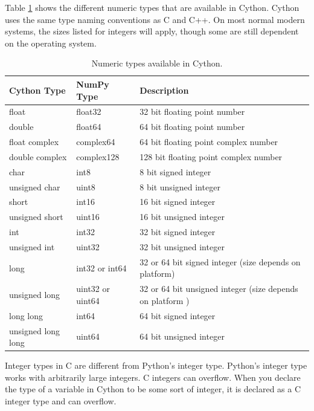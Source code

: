 Table \ref{table:cython_types} shows the different numeric types that are available in Cython.
Cython uses the same type naming conventions as C and C++.
On most normal modern systems, the sizes listed for integers will apply, though some are still dependent on the operating system.

\begin{table}
\begin{center}
\begin{tabular}{|p{2.8cm}|p{2.5cm}|p{6cm}|}
\hline
Cython Type & NumPy Type& Description \\
\hline
float & float32 & 32 bit floating point number \\
double & float64 & 64 bit floating point number \\
float complex & complex64 & 64 bit floating point complex number \\
double complex & complex128 & 128 bit floating point complex number \\
char & int8 & 8 bit signed integer \\
unsigned char & uint8 & 8 bit unsigned integer \\
short & int16 & 16 bit signed integer \\
unsigned short & uint16 & 16 bit unsigned integer \\
int & int32 & 32 bit signed integer \\
unsigned int & uint32 & 32 bit unsigned integer \\
long & int32 or int64 & 32 or 64 bit signed integer (size depends on platform) \\
unsigned long & uint32 or uint64 & 32 or 64 bit unsigned integer (size depends on platform ) \\
long long & int64 & 64 bit signed integer \\
unsigned long long & uint64 & 64 bit unsigned integer \\
\hline
\end{tabular}
\end{center}
\caption{Numeric types available in Cython.}
\label{table:cython_types}
\end{table}

\begin{warn}
Integer types in C are different from Python's integer type.
Python's integer type works with arbitrarily large integers.
C integers can overflow.
When you declare the type of a variable in Cython to be some sort of integer, it is declared as a C integer type and can overflow.
\end{warn} 

